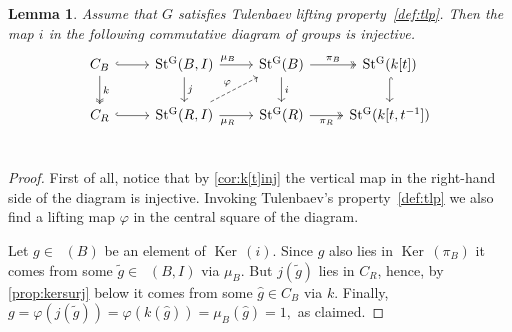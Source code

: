 \documentclass[oneside,12pt]{amsart}
\numberwithin{equation}{section}
\newtheorem{lem}{Lemma}
\numberwithin{lem}{section}
\theoremstyle{definition}
\theoremstyle{remark}
\DeclareMathOperator{\St}{St^G}
\DeclareMathOperator{\Bigker}{Ker\,}
\begin{document}
\begin{lem} \label{lem:tulinj} Assume that $G$ satisfies Tulenbaev lifting property~\ref{def:tlp}. 
Then the map $i$ in the following commutative diagram of groups is injective.
\begin{equation} \label{diag:cs} \begin{tikzcd} 
C_{B} \ar[r, hookrightarrow] \ar[d, "k", twoheadrightarrow] & \St(B, I) \ar[r, "\mu_B" near start] \ar[d, "j"] & \ar[d, "i"] \St(B) \ar[r, "\pi_B", twoheadrightarrow] & \St(k[t]) \ar[d, hookrightarrow] \\     
C_{R} \ar[r, hookrightarrow]                                & \St(R, I) \ar[ur, dashrightarrow, "\varphi"] \ar[r, "\mu_R"' near start] & \St(R) \ar[r, "\pi_R"', twoheadrightarrow] & \St(k[t, t^{-1}]) \\ \end{tikzcd} \end{equation} \end{lem}
\begin{proof} First of all, notice that by \cref{cor:k[t]inj} the vertical map in the right-hand side of the diagram is injective.
 Invoking Tulenbaev's property~\ref{def:tlp} we also find a lifting map $\varphi$ in the central square of the diagram.

 Let $g \in \St(B)$ be an element of $\Bigker(i)$.
 Since $g$ also lies in $\Bigker(\pi_B)$ it comes from some $\widetilde{g} \in \St(B, I)$ via $\mu_B$.
 But $j(\widetilde{g})$ lies in $C_R$, hence, by \cref{prop:kersurj} below it comes from some $\widehat{g} \in C_B$ via $k$.
 Finally, $g = \varphi(j(\widetilde{g})) = \varphi(k(\widehat{g})) = \mu_B(\widehat{g}) = 1,$ as claimed. \end{proof}
\end{document}
